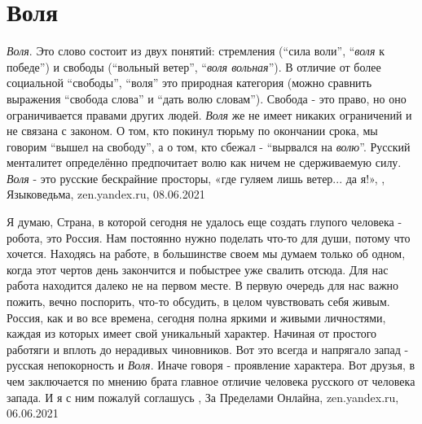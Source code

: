  
 
 
 
 
\chapter{Воля}
\label{sec:slova.volja}

\emph{Воля}. Это слово состоит из двух понятий: стремления (\enquote{сила воли},
\enquote{\emph{воля} к победе}) и свободы (\enquote{вольный ветер}, \enquote{\emph{воля
вольная}}). В отличие от более социальной \enquote{свободы}, \enquote{воля} это
природная категория (можно сравнить выражения \enquote{свобода слова} и
\enquote{дать волю словам}). Свобода - это право, но оно ограничивается правами
других людей. \emph{Воля} же не имеет никаких ограничений и не связана с законом. О
том, кто покинул тюрьму по окончании срока, мы говорим \enquote{вышел на
свободу}, а о том, кто сбежал - \enquote{вырвался на \emph{волю}}. Русский менталитет
определённо предпочитает волю как ничем не сдерживаемую силу. \emph{Воля} - это
русские бескрайние просторы, «где гуляем лишь ветер... да я!»,
, Языковедьма, zen.yandex.ru, 08.06.2021

Я думаю, Страна, в которой сегодня не удалось еще создать глупого
человека - робота, это Россия. Нам постоянно нужно поделать что-то для души,
потому что хочется. Находясь на работе, в большинстве своем мы думаем только об
одном, когда этот чертов день закончится и побыстрее уже свалить отсюда. Для
нас работа находится далеко не на первом месте. В первую очередь для нас важно
пожить, вечно поспорить, что-то обсудить, в целом чувствовать себя живым.
Россия, как и во все времена, сегодня полна яркими и живыми личностями, каждая
из которых имеет свой уникальный характер. Начиная от простого работяги и
вплоть до нерадивых чиновников. Вот это всегда и напрягало запад - русская
непокорность и \emph{Воля}. Иначе говоря - проявление характера.  Вот друзья, в чем
заключается по мнению брата главное отличие человека русского от человека
запада. И я с ним пожалуй соглашусь
, 
За Пределами Онлайна, zen.yandex.ru, 06.06.2021

